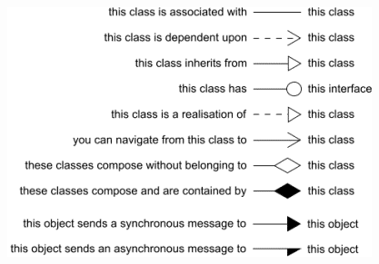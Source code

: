 \documentclass{article}[18pt]
\begin{document}
\begin{itemize}
\begin{center}
	\includegraphics[scale=0.7]{"Class Diagrams1"}
\end{center}

\end{itemize}
\end{document}
